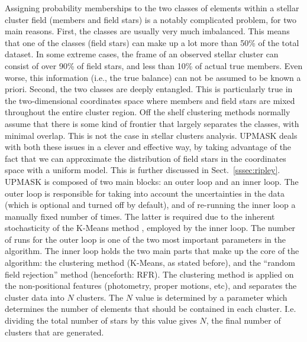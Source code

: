 \documentclass{aa}
\begin{document}
 Assigning probability memberships to the two classes of elements within a 
 stellar cluster field (members and field stars) is a notably complicated
 problem, for two main reasons. First, the classes are usually very much
 imbalanced. This means that one of the classes (field stars) can make up a
 lot more than 50\% of the total dataset. In some extreme cases, the frame of
 an observed stellar cluster can consist of over 90\% of field stars, and less
 than 10\% of actual true members. Even worse, this information (i.e., the
 true balance) can not be assumed to be known a priori.
 Second, the two classes are deeply entangled. This is particularly true in the
 two-dimensional coordinates space where members and field stars are mixed
 throughout the entire cluster region. Off the shelf clustering methods
 normally assume that there is some kind of frontier that largely separates
 the classes, with minimal overlap. This is not the case in stellar clusters
 analysis.
 UPMASK deals with both these issues in a clever and effective way, by taking
 advantage of the fact that we can approximate the distribution of field stars
 in the coordinates space with a uniform model. This is further discussed
 in Sect.~\ref{sssec:ripley}.\\

 UPMASK is composed of two main blocks: an outer loop and an inner
 loop. The outer loop is responsible for taking into account the uncertainties
 in the data (which is optional and turned off by default), and of re-running
 the inner loop a manually fixed number of times. The latter is required due
 to the inherent stochasticity of the K-Means method \citep{macqueen1967},
 employed by the inner loop. The number of runs for the outer loop is one of
 the two most important parameters in the algorithm.
 The inner loop holds the two main parts that make up the core of the
 algorithm: the clustering method (K-Means, as stated before), and the
 ``random field rejection'' method (henceforth: RFR).
 The clustering method is applied on the non-positional features (photometry,
 proper motions, etc), and separates the cluster data into $N$ clusters. The
 $N$ value is determined by a parameter
 which determines the number of elements that should be
 contained in each cluster. I.e. dividing the total number of stars by this
 value gives $N$, the final number of clusters that are generated.
 
\end{document}
